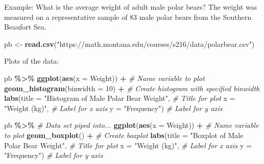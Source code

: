 \documentclass[
]{report}
\newenvironment{Shaded}{\begin{snugshade}}{\end{snugshade}}
\newcommand{\AttributeTok}[1]{\textcolor[rgb]{0.13,0.29,0.53}{#1}}
\newcommand{\CommentTok}[1]{\textcolor[rgb]{0.56,0.35,0.01}{\textit{#1}}}
\newcommand{\DecValTok}[1]{\textcolor[rgb]{0.00,0.00,0.81}{#1}}
\newcommand{\FunctionTok}[1]{\textcolor[rgb]{0.13,0.29,0.53}{\textbf{#1}}}
\newcommand{\NormalTok}[1]{#1}
\newcommand{\OtherTok}[1]{\textcolor[rgb]{0.56,0.35,0.01}{#1}}
\newcommand{\SpecialCharTok}[1]{\textcolor[rgb]{0.81,0.36,0.00}{\textbf{#1}}}
\newcommand{\StringTok}[1]{\textcolor[rgb]{0.31,0.60,0.02}{#1}}
\begin{document}

Example: What is the average weight of adult male polar bears? The weight was measured on a representative sample of 83 male polar bears from the Southern Beaufort Sea.

\begin{Shaded}
\begin{Highlighting}[]
\NormalTok{pb }\OtherTok{\textless{}{-}} \FunctionTok{read.csv}\NormalTok{(}\StringTok{"https://math.montana.edu/courses/s216/data/polarbear.csv"}\NormalTok{)}
\end{Highlighting}
\end{Shaded}

Plots of the data:

\begin{Shaded}
\begin{Highlighting}[]
\NormalTok{pb }\SpecialCharTok{\%\textgreater{}\%}
    \FunctionTok{ggplot}\NormalTok{(}\FunctionTok{aes}\NormalTok{(}\AttributeTok{x =}\NormalTok{ Weight)) }\SpecialCharTok{+}   \CommentTok{\# Name variable to plot}
    \FunctionTok{geom\_histogram}\NormalTok{(}\AttributeTok{binwidth =} \DecValTok{10}\NormalTok{) }\SpecialCharTok{+}  \CommentTok{\# Create histogram with specified binwidth}
    \FunctionTok{labs}\NormalTok{(}\AttributeTok{title =} \StringTok{"Histogram of Male Polar Bear Weight"}\NormalTok{, }\CommentTok{\# Title for plot}
       \AttributeTok{x =} \StringTok{"Weight (kg)"}\NormalTok{, }\CommentTok{\# Label for x axis}
       \AttributeTok{y =} \StringTok{"Frequency"}\NormalTok{) }\CommentTok{\# Label for y axis}

\NormalTok{pb }\SpecialCharTok{\%\textgreater{}\%} \CommentTok{\# Data set piped into...}
\FunctionTok{ggplot}\NormalTok{(}\FunctionTok{aes}\NormalTok{(}\AttributeTok{x =}\NormalTok{ Weight)) }\SpecialCharTok{+}   \CommentTok{\# Name variable to plot}
  \FunctionTok{geom\_boxplot}\NormalTok{() }\SpecialCharTok{+}  \CommentTok{\# Create boxplot}
  \FunctionTok{labs}\NormalTok{(}\AttributeTok{title =} \StringTok{"Boxplot of Male Polar Bear Weight"}\NormalTok{, }\CommentTok{\# Title for plot}
       \AttributeTok{x =} \StringTok{"Weight (kg)"}\NormalTok{, }\CommentTok{\# Label for x axis}
       \AttributeTok{y =} \StringTok{"Frequency"}\NormalTok{) }\CommentTok{\# Label for y axis}
\end{Highlighting}
\end{Shaded}
\end{document}

